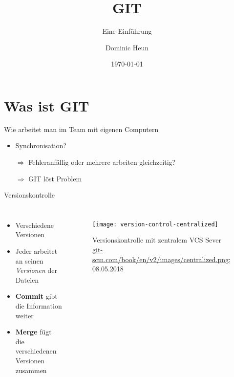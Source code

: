 \documentclass{beamer}
\title{GIT}
\subtitle{Eine Einführung}
\author[Dominic]{Dominic Heun}
\institute{AES Ettlingen - TGJ2/2}
\date{\today}
\begin{document}


  \begin{frame}[plain]
    \titlepage
  \end{frame}

  \section{Was ist GIT}

  \begin{frame}{Wie arbeitet man im Team mit eigenen Computern}
    \begin{itemize}[<+->]
      \item Synchronisation?
      \item[$\Rightarrow$] Fehleranfällig oder mehrere arbeiten gleichzeitig?
      \item[$\Rightarrow$] GIT löst Problem
    \end{itemize}
  \end{frame}

  \begin{frame}{Versionskontrolle}
      \begin{columns}

          \begin{itemize}[<+->]
            \item Verschiedene Versionen
            \item Jeder arbeitet an seinen \textit{Versionen} der Dateien
            \item \textbf{Commit} gibt die Information weiter
            \item \textbf{Merge} fügt die verschiedenen Versionen zusammen
          \end{itemize}

          \begin{figure}
            \texttt{[image: version-control-centralized]}
            \caption{
              Versionskontrolle mit zentralem VCS Sever
              \tiny{
                \url{git-scm.com/book/en/v2/images/centralized.png}; 08.05.2018
              }
            }
          \end{figure}
      \end{columns}
  \end{frame}
\end{document}
